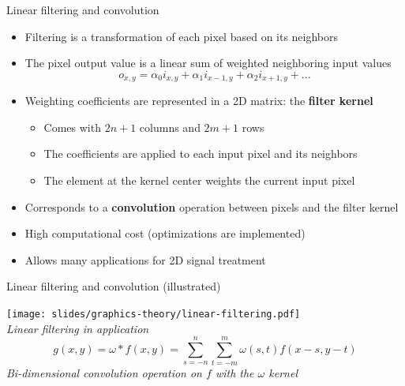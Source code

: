 \begin{frame}{Linear filtering and convolution}
  \begin{itemize}
  \item Filtering is a transformation of each pixel based on its neighbors
  \item The pixel output value is a linear sum of weighted neighboring input values
\[
o_{x,y} = \alpha_0 i_{x,y} + \alpha_1 i_{x-1,y} + \alpha_2 i_{x+1,y} + ...
\]
  \item Weighting coefficients are represented in a 2D matrix: the \textbf{filter kernel}
    \begin{itemize}
    \item Comes with \(2n + 1\) columns and \(2m + 1\) rows
    \item The coefficients are applied to each input pixel and its neighbors
    \item The element at the kernel center weights the current input pixel
    \end{itemize}
  \item Corresponds to a \textbf{convolution} operation between pixels and the filter kernel
  \item High computational cost (optimizations are implemented)
  \item Allows many applications for 2D signal treatment
  \end{itemize}
\end{frame}

\begin{frame}{Linear filtering and convolution (illustrated)}
  \begin{center}
  \texttt{[image: slides/graphics-theory/linear-filtering.pdf]}\\
  \textit{\small Linear filtering in application}
\[
g(x,y)= \omega *f(x,y)=\sum_{s=-n}^n{\sum_{t=-m}^m{ \omega (s,t)f(x-s,y-t)}}
\]
  \textit{\small Bi-dimensional convolution operation on \(f\) with the \(\omega\) kernel}
  \end{center}
\end{frame}

